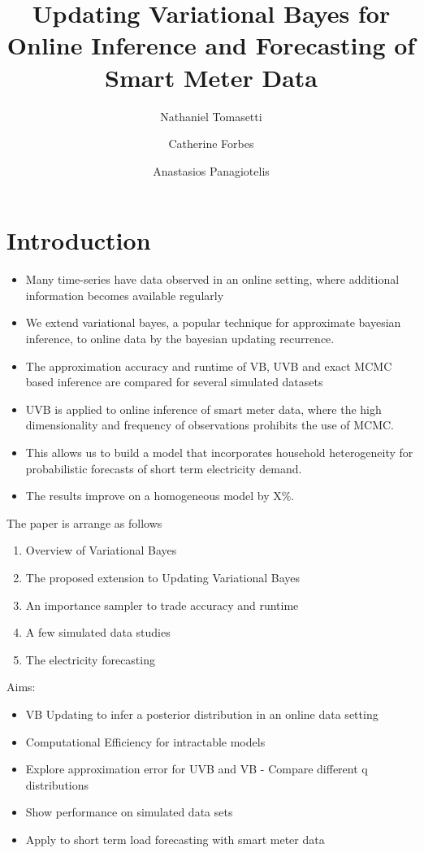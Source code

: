 \documentclass[12pt,a4paper]{article}\usepackage[]{graphicx}\usepackage[]{color}
\title{Updating Variational Bayes for Online Inference and Forecasting of Smart Meter Data}
\author{Nathaniel Tomasetti 
\and Catherine Forbes
\and Anastasios Panagiotelis}
\begin{document}
\maketitle



\section{Introduction}
\label{sec:intro}

\begin{itemize}
\item Many time-series have data observed in an online setting, where additional information becomes available regularly
\item We extend variational bayes, a popular technique for approximate bayesian inference, to online data by the bayesian updating recurrence.
\item The approximation accuracy and runtime of VB, UVB and exact MCMC based inference are compared for several simulated datasets
\item UVB is applied to online inference of smart meter data, where the high dimensionality and frequency of observations prohibits the use of MCMC.
\item This allows us to build a model that incorporates household heterogeneity for probabilistic forecasts of short term electricity demand.
\item The results improve on a homogeneous model by X\%.
\end{itemize}
The paper is arrange as follows
\begin{enumerate}
\item Overview of Variational Bayes
\item The proposed extension to Updating Variational Bayes
\item An importance sampler to trade accuracy and runtime
\item A few simulated data studies
\item The electricity forecasting
\end{enumerate}

Aims:
\begin{itemize}
\item VB Updating to infer a posterior distribution in an online data setting
\item Computational Efficiency for intractable models
\item Explore approximation error for UVB and VB - Compare different q distributions
\item Show performance on simulated data sets
\item Apply to short term load forecasting with smart meter data
\end{itemize}
\end{document}
